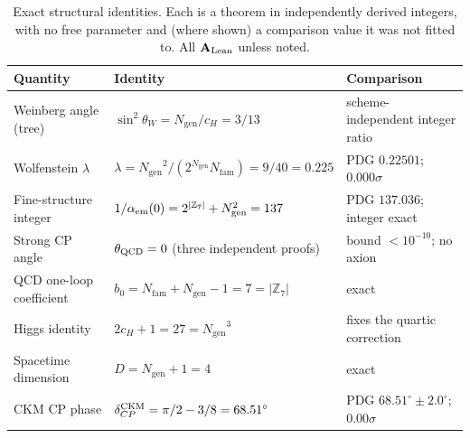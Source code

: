\documentclass[11pt]{article}
\newcommand{\ZS}{\ensuremath{\mathbb{Z}_7}}
\newcommand{\Ngen}{\ensuremath{N_{\mathrm{gen}}}}
\newcommand{\Nfam}{\ensuremath{N_{\mathrm{fam}}}}
\newcommand{\sigW}{\ensuremath{\sin^2\!\theta_W}}
\newcommand{\CatAL}{\ensuremath{\textbf{A}_{\rm Lean}}}
\begin{document}
\begin{table}[htbp]
\centering
\caption{Exact structural identities.  Each is a theorem in independently derived
integers, with no free parameter and (where shown) a comparison value it was not
fitted to.  All \CatAL{} unless noted.}
\label{tab:identities}
\small\renewcommand{\arraystretch}{1.2}
\begin{tabularx}{\textwidth}{@{}P{4.6cm}P{4.6cm}Y@{}}
\toprule
\textbf{Quantity} & \textbf{Identity} & \textbf{Comparison} \\
\midrule
Weinberg angle (tree) & $\sigW = \Ngen/c_H = 3/13$ & scheme-independent integer ratio \\
Wolfenstein $\lambda$ & $\lambda = \Ngen^2/(2^{\Ngen}\Nfam) = 9/40 = 0.225$ &
  PDG $0.22501$; $0.000\sigma$ \\
Fine-structure integer & $1/\alpha_{\rm em}(0) = 2^{|\ZS|}+\Ngen^2 = 137$ &
  PDG $137.036$; integer exact \\
Strong CP angle & $\theta_{\rm QCD} = 0$ (three independent proofs) &
  bound $<10^{-10}$; no axion \\
QCD one-loop coefficient & $b_0 = \Nfam+\Ngen-1 = 7 = |\ZS|$ & exact \\
Higgs identity & $2c_H+1 = 27 = \Ngen^3$ & fixes the quartic correction \\
Spacetime dimension & $D = \Ngen+1 = 4$ & exact \\
CKM CP phase & $\delta_{CP}^{\rm CKM} = \pi/2 - 3/8 = 68.51^\circ$ &
  PDG $68.51^\circ\pm2.0^\circ$; $0.00\sigma$ \\
\bottomrule
\end{tabularx}
\end{table}
\end{document}
